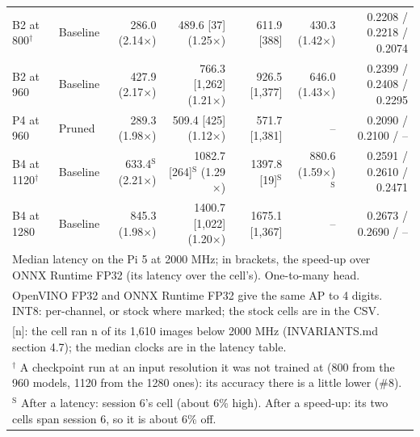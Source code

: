 \begin{tabular}{llrrrrr}
B2 at 800$^{\dagger}$ & Baseline & 286.0 (2.14$\times$) & 489.6 [37] (1.25$\times$) & 611.9 [388] & 430.3 (1.42$\times$) & 0.2208 / 0.2218 / 0.2074 \\
B2 at 960 & Baseline & 427.9 (2.17$\times$) & 766.3 [1{,}262] (1.21$\times$) & 926.5 [1{,}377] & 646.0 (1.43$\times$) & 0.2399 / 0.2408 / 0.2295 \\
P4 at 960 & Pruned & 289.3 (1.98$\times$) & 509.4 [425] (1.12$\times$) & 571.7 [1{,}381] & -- & 0.2090 / 0.2100 / -- \\
B4 at 1120$^{\dagger}$ & Baseline & 633.4$^{\mathrm{S}}$ (2.21$\times$) & 1082.7 [264]$^{\mathrm{S}}$ (1.29$\times$) & 1397.8 [19]$^{\mathrm{S}}$ & 880.6 (1.59$\times$)$^{\mathrm{S}}$ & 0.2591 / 0.2610 / 0.2471 \\
B4 at 1280 & Baseline & 845.3 (1.98$\times$) & 1400.7 [1{,}022] (1.20$\times$) & 1675.1 [1{,}367] & -- & 0.2673 / 0.2690 / -- \\
\bottomrule
\multicolumn{7}{l}{\footnotesize Median latency on the Pi 5 at 2000 MHz; in brackets, the speed-up over ONNX Runtime FP32 (its latency over the cell's). One-to-many head.} \\
\multicolumn{7}{l}{\footnotesize OpenVINO FP32 and ONNX Runtime FP32 give the same AP to 4 digits. INT8: per-channel, or stock where marked; the stock cells are in the CSV.} \\
\multicolumn{7}{l}{\footnotesize [n]: the cell ran n of its 1,610 images below 2000 MHz (INVARIANTS.md section 4.7); the median clocks are in the latency table.} \\
\multicolumn{7}{l}{\footnotesize $^{\dagger}$ A checkpoint run at an input resolution it was not trained at (800 from the 960 models, 1120 from the 1280 ones): its accuracy there is a little lower (\#8).} \\
\multicolumn{7}{l}{\footnotesize $^{\mathrm{S}}$ After a latency: session 6's cell (about 6\% high). After a speed-up: its two cells span session 6, so it is about 6\% off.} \\
\end{tabular}
